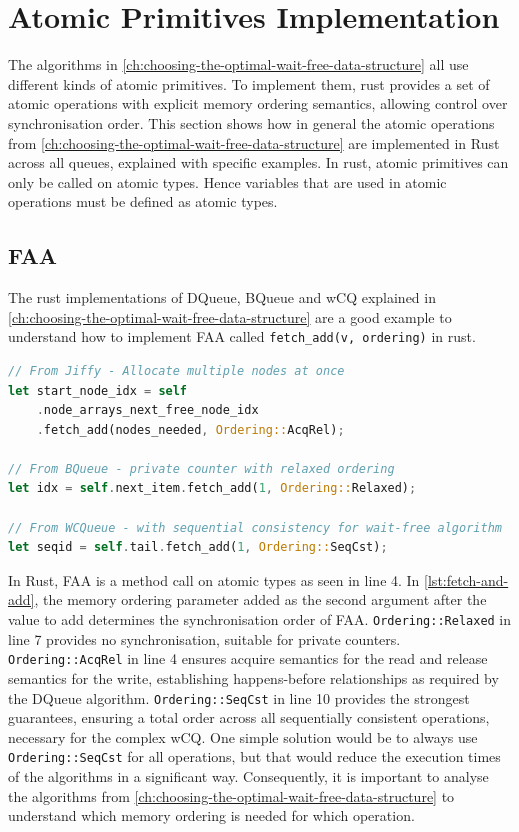 \section{Atomic Primitives Implementation}

The algorithms in \cref{ch:choosing-the-optimal-wait-free-data-structure} all use different kinds of atomic primitives. To implement them, rust provides a set of atomic operations with explicit memory ordering semantics, allowing control over synchronisation order. This section shows how in general the atomic operations from \cref{ch:choosing-the-optimal-wait-free-data-structure} are implemented in Rust across all queues, explained with specific examples. In rust, atomic primitives can only be called on atomic types. Hence variables that are used in atomic operations must be defined as atomic types.

\subsection{\acf{FAA}}

The rust implementations of DQueue, BQueue and \ac{wCQ} explained in \cref{ch:choosing-the-optimal-wait-free-data-structure} are a good example to understand how to implement \ac{FAA} called \texttt{fetch\_add(v, ordering)} in rust.

\begin{lstlisting}[language=Rust, style=boxed, caption={Fetch-and-add with different memory orderings}, label={lst:fetch-and-add}]
// From Jiffy - Allocate multiple nodes at once
let start_node_idx = self
    .node_arrays_next_free_node_idx
    .fetch_add(nodes_needed, Ordering::AcqRel);

// From BQueue - private counter with relaxed ordering
let idx = self.next_item.fetch_add(1, Ordering::Relaxed);

// From WCQueue - with sequential consistency for wait-free algorithm
let seqid = self.tail.fetch_add(1, Ordering::SeqCst);
\end{lstlisting}

In Rust, \ac{FAA} is a method call on atomic types as seen in line 4. In \cref{lst:fetch-and-add}, the memory ordering parameter added as the second argument after the value to add determines the synchronisation order of \ac{FAA}. \texttt{Ordering::Relaxed} in line 7 provides no synchronisation, suitable for private counters. \texttt{Ordering::AcqRel} in line 4 ensures acquire semantics for the read and release semantics for the write, establishing happens-before relationships as required by the DQueue algorithm. \texttt{Ordering::SeqCst} in line 10 provides the strongest guarantees, ensuring a total order across all sequentially consistent operations, necessary for the complex \ac{wCQ}. One simple solution would be to always use \texttt{Ordering::SeqCst} for all operations, but that would reduce the execution times of the algorithms in a significant way. Consequently, it is important to analyse the algorithms from \cref{ch:choosing-the-optimal-wait-free-data-structure} to understand which memory ordering is needed for which operation.

